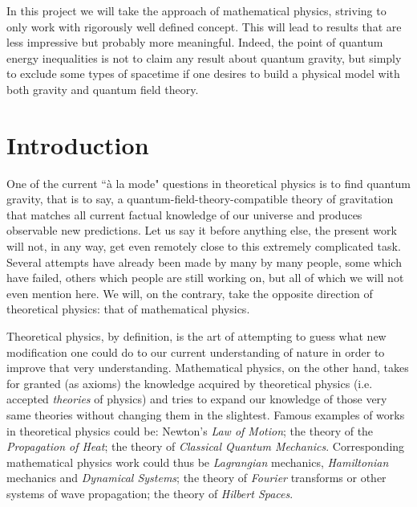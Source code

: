\documentclass[a4paper,11pt]{article}
\numberwithin{equation}{section}
\theoremstyle{definition}
\begin{document}
In this project we will take the approach of mathematical physics, striving to only work with rigorously well defined concept. This will lead to results that are less impressive but probably more meaningful. Indeed, the point of quantum energy inequalities is not to claim any result about quantum gravity, but simply to exclude some types of spacetime if one desires to build a physical model with both gravity and quantum field theory. 

\addtocounter{section}{-1}
\section{Introduction}
One of the current ``à la mode" questions in theoretical physics is to find quantum gravity, that is to say, a quantum-field-theory-compatible theory of gravitation that matches all current factual knowledge of our universe and produces observable new predictions.
Let us say it before anything else, the present work will not, in any way, get even remotely close to this extremely complicated task. Several attempts have already been made by many by many people, some which have failed, others which people are still working on, but all of which we will not even mention here. 
We will, on the contrary, take the opposite direction of theoretical physics: that of mathematical physics.

Theoretical physics, by definition, is the art of attempting to guess what new modification one could do to our current understanding of nature in order to improve that very understanding. Mathematical physics, on the other hand, takes for granted (as axioms) the knowledge acquired by theoretical physics (i.e. accepted \emph{theories} of physics) and tries to expand our knowledge of those very same theories without changing them in the slightest. Famous examples of works in theoretical physics could be: Newton's \textit{Law of Motion}; the theory of the \textit{Propagation of Heat}; the theory of \textit{Classical Quantum Mechanics}. Corresponding mathematical physics work could thus be \textit{Lagrangian} mechanics, \textit{Hamiltonian} mechanics and \textit{Dynamical Systems}; the theory of \textit{Fourier} transforms or other systems of wave propagation; the theory of \textit{Hilbert Spaces}.
\end{document}
